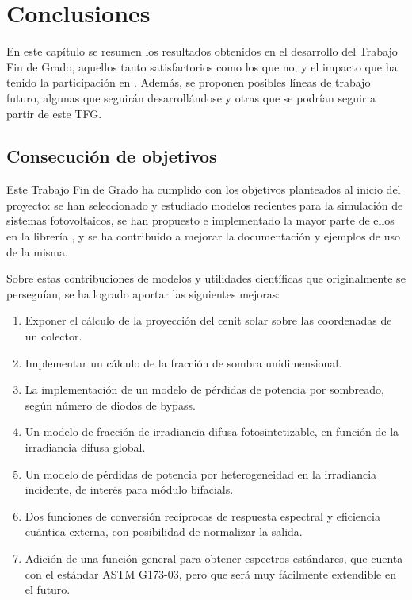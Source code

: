 \chapter{Conclusiones} \label{chp:conclusiones}

En este capítulo se resumen los resultados obtenidos en el desarrollo del Trabajo Fin de Grado, aquellos tanto satisfactorios como los que no, y el impacto que ha tenido la participación en \pvlibpy{}. Además, se proponen posibles líneas de trabajo futuro, algunas que seguirán desarrollándose y otras que se podrían seguir a partir de este TFG.


\section{Consecución de objetivos}

Este Trabajo Fin de Grado ha cumplido con los objetivos planteados al inicio del proyecto: se han seleccionado y estudiado modelos recientes para la simulación de sistemas fotovoltaicos, se han propuesto e implementado la mayor parte de ellos en la librería \pvlibpy{}, y se ha contribuido a mejorar la documentación y ejemplos de uso de la misma.

Sobre estas contribuciones de modelos y utilidades científicas que originalmente se perseguían, se ha logrado aportar las siguientes mejoras:

\begin{enumerate}
    \item Exponer el cálculo de la proyección del \gls{cenit} solar sobre las coordenadas de un colector.
    \item Implementar un cálculo de la fracción de \gls{sombra} unidimensional.
    \item La implementación de un modelo de pérdidas de potencia por sombreado, según número de \gls{diodos de bypass}.
    \item Un modelo de fracción de irradiancia difusa fotosintetizable, en función de la irradiancia \gls{difusa} global.
    \item Un modelo de pérdidas de potencia por heterogeneidad en la irradiancia incidente, de interés para \glspl{módulo bifacial}.
    \item Dos funciones de conversión recíprocas de \gls{respuesta espectral} y \gls{eficiencia cuántica externa}, con posibilidad de normalizar la salida.
    \item Adición de una función general para obtener espectros estándares, que cuenta con el \gls{estándar} ASTM G173-03, pero que será muy fácilmente extendible en el futuro.
\end{enumerate}

